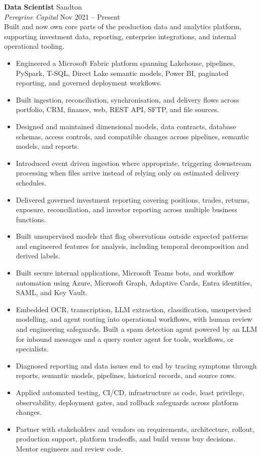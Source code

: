 \documentclass[10pt,a4paper]{article}
\newcommand{\role}[4]{%
  \noindent\textbf{#1} \hfill \textcolor{muted}{#3}\\
  \textit{#2} \hfill \textcolor{muted}{#4}\\[2pt]
}
\begin{document}
\role{Data Scientist}{Peregrine Capital}{Sandton}{Nov 2021 -- Present}
Built and now own core parts of the production data and analytics platform, supporting investment data,
reporting, enterprise integrations, and internal operational tooling.
\begin{itemize}
  \item Engineered a Microsoft Fabric platform spanning Lakehouse, pipelines, PySpark, T-SQL, Direct Lake
    semantic models, Power BI, paginated reporting, and governed deployment workflows.
  \item Built ingestion, reconciliation, synchronisation, and delivery flows across portfolio, CRM, finance,
    web, REST API, SFTP, and file sources.
  \item Designed and maintained dimensional models, data contracts, database schemas, access controls, and
    compatible changes across pipelines, semantic models, and reports.
  \item Introduced event driven ingestion where appropriate, triggering downstream processing when files
    arrive instead of relying only on estimated delivery schedules.
  \item Delivered governed investment reporting covering positions, trades, returns, exposure,
    reconciliation, and investor reporting across multiple business functions.
  \item Built unsupervised models that flag observations outside expected patterns and engineered features
    for analysis, including temporal decomposition and derived labels.
  \item Built secure internal applications, Microsoft Teams bots, and workflow automation using Azure,
    Microsoft Graph, Adaptive Cards, Entra identities, SAML, and Key Vault.
  \item Embedded OCR, transcription, LLM extraction, classification, unsupervised modelling, and agent
    routing into operational workflows, with human review and engineering safeguards. Built a spam detection
    agent powered by an LLM for inbound messages and a query router agent for tools, workflows, or specialists.
  \item Diagnosed reporting and data issues end to end by tracing symptoms through reports, semantic models,
    pipelines, historical records, and source rows.
  \item Applied automated testing, CI/CD, infrastructure as code, least privilege, observability, deployment
    gates, and rollback safeguards across platform changes.
  \item Partner with stakeholders and vendors on requirements, architecture, rollout, production support,
    platform tradeoffs, and build versus buy decisions. Mentor engineers and review code.
\end{itemize}
\end{document}
